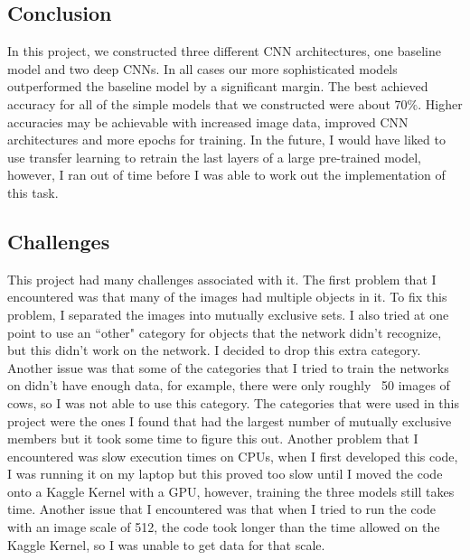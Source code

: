 \documentclass[10pt,a4paper]{article}
\begin{document}
\subsection{Conclusion}
In this project, we constructed three different CNN architectures, one baseline model and two deep CNNs. In all cases our more sophisticated models outperformed the baseline model by a significant margin. The best achieved accuracy for all of the simple models that we constructed were about $70 \%$. Higher accuracies may be achievable with increased image data, improved CNN architectures and more epochs for training. In the future, I would have liked to use transfer learning to retrain the last layers of a large pre-trained model, however, I ran out of time before I was able to work out the implementation of this task.

\newpage
\subsection{Challenges}
This project had many challenges associated with it. The first problem that I encountered was that many of the images had multiple objects in it. To fix this problem, I separated the images into mutually exclusive sets. I also tried at one point to use an ``other" category for objects that the network didn't recognize, but this didn't work on the network. I decided to drop this extra category. Another issue was that some of the categories that I tried to train the networks on didn't have enough data, for example, there were only roughly ~50 images of cows, so I was not able to use this category. The categories that were used in this project were the ones I found that had the largest number of mutually exclusive members but it took some time to figure this out. Another problem that I encountered was slow execution times on CPUs, when I first developed this code, I was running it on my laptop but this proved too slow until I moved the code onto a Kaggle Kernel with a GPU, however, training the three models still takes time. Another issue that I encountered was that when I tried to run the code with an image scale of 512, the code took longer than the time allowed on the Kaggle Kernel, so I was unable to get data for that scale.
\end{document}
